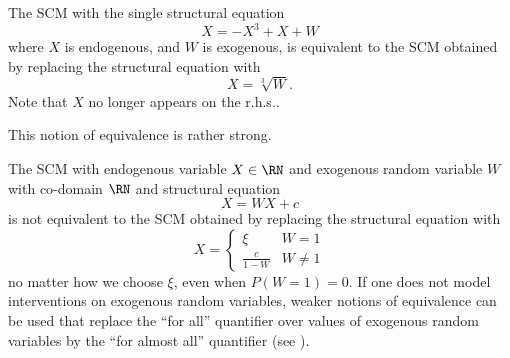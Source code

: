 \begin{Eg}\label{eg:equivalent_scm}
  The SCM with the single structural equation
  $$X = -X^3 + X + W$$
  where $X$ is endogenous, and $W$ is exogenous, is equivalent to the SCM obtained by replacing the structural equation with
  $$X = \sqrt[3]{W}.$$
  Note that $X$ no longer appears on the r.h.s..
\end{Eg}
This notion of equivalence is rather strong. 
\begin{Eg}\label{eg:self_cycle}
  The SCM with endogenous variable $X \in \RN$ and exogenous random variable $W$ with co-domain $\RN$ and structural equation
  $$X = W X + c$$
  is not equivalent to the SCM obtained by replacing the structural equation with
  $$X = \begin{cases}
          \xi & W = 1 \\
          \frac{c}{1 - W} & W \ne 1
        \end{cases}$$
  no matter how we choose $\xi$, even when $P(W=1) = 0$. 
  If one does not model interventions on exogenous random variables, weaker notions of equivalence 
  can be used that replace the ``for all'' quantifier over values of exogenous random variables by the
  ``for almost all'' quantifier (see \cite{BFPM21}).
\end{Eg}

